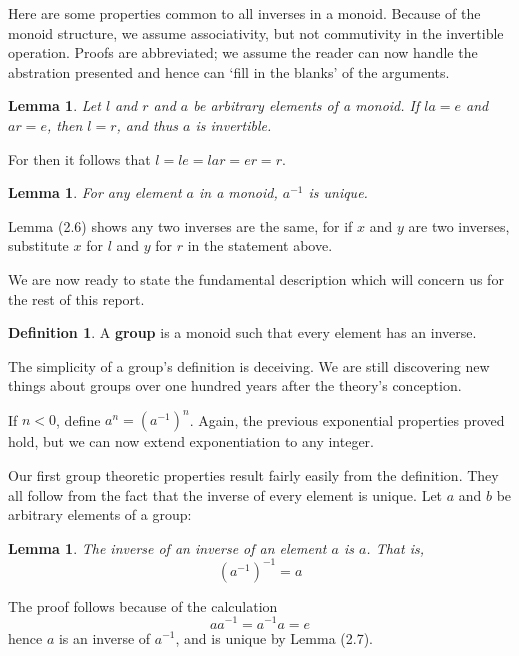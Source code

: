 \documentclass[12pt]{amsbook}
\makeatletter
\theoremstyle{plain}
\newtheorem{lemma}[theorem]{Lemma}
\theoremstyle{definition}
\newtheorem{definition}{Definition}
\renewenvironment{proof}[1][\proofname]{\par
  \pushQED{\qed}%
  \normalfont \topsep6\p@\@plus6\p@\relax
  \list{}{\leftmargin=0em
          \rightmargin=\leftmargin
          \settowidth{\itemindent}{\itshape#1}%
          \labelwidth=\itemindent}

  \item[\hskip\labelsep
        \itshape
    #1\@addpunct{.}]\ignorespaces
}{%
  \popQED\endlist\@endpefalse
}
\makeatother
\begin{document}
Here are some properties common to all inverses in a monoid. Because of the monoid structure, we assume associativity, but not commutivity in the invertible operation. Proofs are abbreviated; we assume the reader can now handle the abstration presented and hence can `fill in the blanks' of the arguments.

\begin{lemma} Let $l$ and $r$ and $a$ be arbitrary elements of a monoid. If $la = e$ and $ar = e$, then $l = r$, and thus $a$ is invertible. \end{lemma}
\begin{proof} For then it follows that $l = le = lar = er = r$. \end{proof}

\begin{lemma} For any element $a$ in a monoid, $a^{-1}$ is unique. \end{lemma}
\begin{proof} Lemma (2.6) shows any two inverses are the same, for if $x$ and $y$ are two inverses, substitute $x$ for $l$ and $y$ for $r$ in the statement above. \end{proof}

We are now ready to state the fundamental description which will concern us for the rest of this report.

\begin{definition}
    A {\bf group} is a monoid such that every element has an inverse.
\end{definition}

The simplicity of a group's definition is deceiving. We are still discovering new things about groups over one hundred years after the theory's conception.

If $n < 0$, define $a^n = (a^{-1})^{n}$. Again, the previous exponential properties proved hold, but we can now extend exponentiation to any integer.

Our first group theoretic properties result fairly easily from the definition. They all follow from the fact that the inverse of every element is unique. Let $a$ and $b$ be arbitrary elements of a group:

\begin{lemma} The inverse of an inverse of an element $a$ is $a$. That is,
    \[ (a^{-1})^{-1} = a \]
\end{lemma}
\begin{proof}
    The proof follows because of the calculation
    \[a a^{-1} = a^{-1} a = e\]
    hence $a$ is an inverse of $a^{-1}$, and is unique by Lemma (2.7).
\end{proof}
\end{document}
